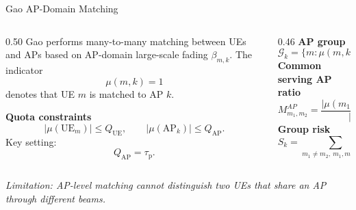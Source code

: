\documentclass[10pt,aspectratio=169]{beamer}
\newcommand{\taup}{\tau_{\mathrm{p}}}
\newcommand{\callout}[1]{%
    \vspace{0.3em}
    {\footnotesize\itshape #1}
}
\begin{document}
\begin{frame}{Gao AP-Domain Matching}
    \small
    \begin{columns}[T,onlytextwidth]
        \begin{column}{0.50\textwidth}
            Gao performs many-to-many matching between UEs and APs based on AP-domain large-scale fading \(\beta_{m,k}\). The indicator
            \[
                \mu(m,k)=1
            \]
            denotes that UE \(m\) is matched to AP \(k\).
            
            \vspace{0.4em}
            \textbf{Quota constraints}
            \[
                |\mu(\mathrm{UE}_m)| \le Q_{\mathrm{UE}},
                \qquad
                |\mu(\mathrm{AP}_k)| \le Q_{\mathrm{AP}}.
            \]
            Key setting:
            \[
                Q_{\mathrm{AP}}=\taup.
            \]
        \end{column}
        \begin{column}{0.46\textwidth}
            \textbf{AP group}
            \[
                \mathcal{G}_k=\{m:\mu(m,k)=1\}.
            \]
            \textbf{Common serving AP ratio}
            \[
                M_{m_1,m_2}^{AP}
                =
                \frac{|\mu(m_1,:)\cap\mu(m_2,:)|}{|\mu(m_1,:)|}.
            \]
            \textbf{Group risk}
            \[
                S_k
                =
                \sum_{m_1\neq m_2,\ m_1,m_2\in\mathcal{G}_k}
                M_{m_1,m_2}^{AP}.
            \]
        \end{column}
    \end{columns}
    
    \vspace{0.3em}
    \callout{Limitation: AP-level matching cannot distinguish two UEs that share an AP through different beams.}
\end{frame}
\end{document}

